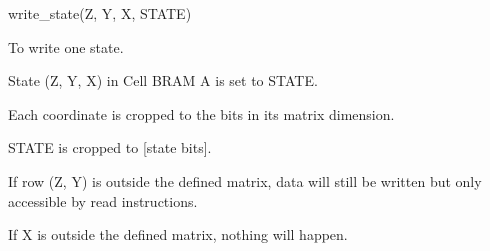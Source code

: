 

\format
write\_state(Z, Y, X, STATE)

\purpose

To write one state.

\description

State (Z, Y, X) in Cell BRAM A is set to STATE.

\notes

Each coordinate is cropped to the bits in its matrix dimension.

STATE is cropped to [state bits].

If row (Z, Y) is outside the defined matrix, data will still be written but only accessible by read instructions.

If X is outside the defined matrix, nothing will happen.
